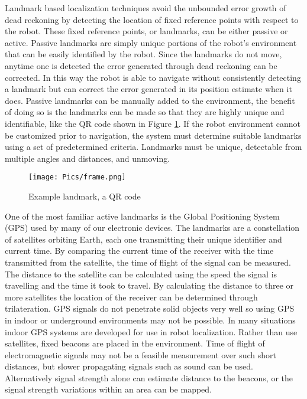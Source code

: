 Landmark based localization techniques avoid the unbounded error growth of dead reckoning by detecting the location of fixed reference points with respect to the robot. These fixed reference points, or landmarks, can be either passive or active. Passive landmarks are simply unique portions of the robot's environment that can be easily identified by the robot. Since the landmarks do not move, anytime one is detected the error generated through dead reckoning can be corrected. In this way the robot is able to navigate without consistently detecting a landmark but can correct the error generated in its position estimate when it does. Passive landmarks can be manually added to the environment, the benefit of doing so is the landmarks can be made so that they are highly unique and identifiable, like the QR code shown in Figure \ref{fig:qr}. If the robot environment cannot be customized prior to navigation, the system must determine suitable landmarks using a set of predetermined criteria. Landmarks must be unique, detectable from multiple angles and distances, and unmoving.\\

\begin{figure}
    \centering
    \texttt{[image: Pics/frame.png]}
    \caption{Example landmark, a QR code}
    \label{fig:qr}
\end{figure}

One of the most familiar active landmarks is the Global Positioning System (GPS) used by many of our electronic devices. The landmarks are a constellation of satellites orbiting Earth, each one transmitting their unique identifier and current time. By comparing the current time of the receiver with the time transmitted from the satellite, the time of flight of the signal can be measured. The distance to the satellite can be calculated using the speed the signal is travelling and the time it took to travel. By calculating the distance to three or more satellites the location of the receiver can be determined through trilateration. GPS signals do not penetrate solid objects very well so using GPS in indoor or underground environments may not be possible. In many situations indoor GPS systems are developed for use in robot localization. Rather than use satellites, fixed beacons are placed in the environment. Time of flight of electromagnetic signals may not be a feasible measurement over such short distances, but slower propagating signals such as sound can be used. Alternatively signal strength alone can estimate distance to the beacons, or the signal strength variations within an area can be mapped.\\

